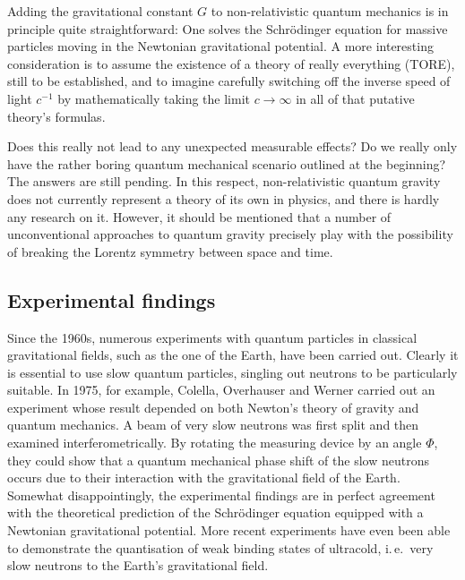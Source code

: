 
\newpage {}
\label{sec:1010}

Adding the gravitational constant $G$ to non-relativistic quantum mechanics is in principle quite straightforward: One solves the Schrödinger equation for massive particles moving in the Newtonian gravitational potential. A more interesting consideration is to assume the existence of a theory of really everything (TORE), still to be established, and to imagine carefully switching off the inverse speed of light $c^{−1}$ by mathematically taking the limit $c\rightarrow\infty$ in all of that putative theory's formulas.

Does this really not lead to any unexpected measurable effects? Do we really only have the rather boring quantum mechanical scenario outlined at the beginning? The answers are still pending. In this respect, non-relativistic quantum gravity does not currently represent a theory of its own in physics, and there is hardly any research on it. However, it should be mentioned that a number of unconventional approaches to quantum gravity precisely play with the possibility of breaking the Lorentz symmetry between space and time.


\subsection*{Experimental findings}

Since the 1960s, numerous experiments with quantum particles in classical gravitational fields, such as the one of the Earth, have been carried out. Clearly it is essential to use slow quantum particles, singling out neutrons to be particularly suitable. In 1975, for example, Colella, Overhauser and Werner carried out an experiment whose result depended on both Newton's theory of gravity and quantum mechanics. A beam of very slow neutrons was first split and then examined interferometrically. By rotating the measuring device by an angle $\Phi$, they could show that a quantum mechanical phase shift of the slow neutrons occurs due to their interaction with the gravitational field of the Earth. Somewhat disappointingly, the experimental findings are in perfect agreement with the theoretical prediction of the Schrödinger equation equipped with a Newtonian gravitational potential. More recent experiments have even been able to demonstrate the quantisation of weak binding states of ultracold, i.\,e.\ very slow neutrons to the Earth's gravitational field.


